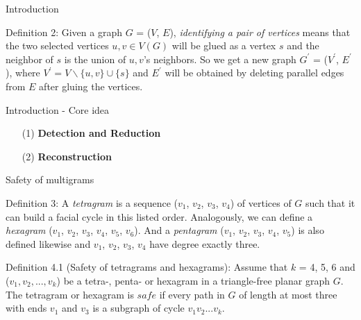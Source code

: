 \documentclass{beamer}
\begin{document}
\begin{frame}{Introduction}
    \begin{block}{Definition 2:}
   Given a graph $G$ = ($V$, $E$), \textit{identifying a pair of vertices} means that the two selected vertices $u, v \in V(G)$ will be glued as a vertex $s$ and the neighbor of $s$ is the union of $u, v$'s neighbors. So we get a new graph $G^{'}$ = ($V^{'}$, $E^{'}$), where $V^{'} = V \backslash \{u, v\} \cup \{s\}$ and $E^{'}$ will be obtained by deleting parallel edges from $E$ after gluing the vertices.
    \end{block}
\end{frame}

\begin{frame}{Introduction - Core idea}
\begin{itemize}
    \item[(1)] \textbf{Detection and Reduction} 
    \newline
    \item[(2)] \textbf{Reconstruction}
\end{itemize}
\end{frame}





\begin{frame}{Safety of multigrams}
\begin{block}{Definition 3: }
    A \textit{tetragram} is a sequence ($v_1$, $v_2$, $v_3$, $v_4$) of vertices of $G$ such that it can build a facial cycle in this listed order. Analogously, we can define a \textit{hexagram} ($v_1$, $v_2$, $v_3$, $v_4$, $v_5$, $v_6$). And a \textit{pentagram} ($v_1$, $v_2$, $v_3$, $v_4$, $v_5$) is also defined likewise and $v_1$, $v_2$, $v_3$, $v_4$ have degree exactly three.
\end{block}
    \begin{block}{Definition 4.1 (Safety of tetragrams and hexagrams):}
    Assume that $k$ = 4, 5, 6 and ($v_1, v_2, ..., v_k$) be a tetra-, penta- or hexagram in a triangle-free planar graph $G$. The tetragram or hexagram is $safe$ if every path in $G$ of length at most three with ends $v_1$ and $v_3$ is a subgraph of cycle $v_1v_2...v_k$.
\end{block}
\end{frame}
\end{document}
